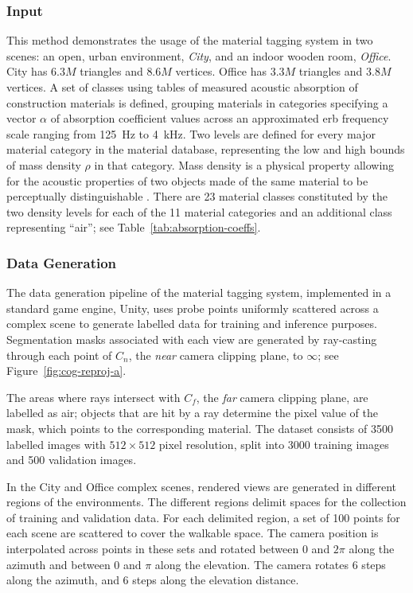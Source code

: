 \subsubsection{Input}
This method demonstrates the usage of the material tagging system in two scenes: an open, urban environment, \emph{City}, and an indoor wooden room, \emph{Office}. City has $6.3M$ triangles and $8.6M$ vertices. Office has $3.3M$ triangles and $3.8M$ vertices. A set of classes using tables of measured acoustic absorption of construction materials is defined, grouping materials in categories specifying a vector $\alpha$ of absorption coefficient values across an approximated \acrfull{erb} frequency scale ranging from \qty{125}{\Hz} to \qty{4}{\kHz}. Two levels are defined for every major material category in the material database, representing the low and high bounds of mass density $\rho$ in that category. Mass density is a physical property allowing for the acoustic properties of two objects made of the same material to be perceptually distinguishable \citep{giordano2006material}. There are 23 material classes constituted by the two density levels for each of the 11 material categories and an additional class representing ``air''; see Table~\ref{tab:absorption-coeffs}.

\subsubsection{Data Generation}
The data generation pipeline of the material tagging system, implemented in a standard game engine, Unity, uses probe points uniformly scattered across a complex scene to generate labelled data for training and inference purposes. Segmentation masks associated with each view are generated by ray-casting through each point of $C_n$, the \emph{near} camera clipping plane, to $\infty$; see Figure~\ref{fig:cog-reproj-a}.\par
The areas where rays intersect with $C_f$, the \emph{far} camera clipping plane, are labelled as air; objects that are hit by a ray determine the pixel value of the mask, which points to the corresponding material. The dataset consists of 3500 labelled images with $512\times512$ pixel resolution, split into 3000 training images and 500 validation images.\par
In the City and Office complex scenes, rendered views are generated in different regions of the environments. The different regions delimit spaces for the collection of training and validation data. For each delimited region, a set of 100 points for each scene are scattered to cover the walkable space. The camera position is interpolated across points in these sets and rotated between 0 and $2\pi$ along the azimuth and between 0 and $\pi$ along the elevation. The camera rotates 6 steps along the azimuth, and 6 steps along the elevation distance.


